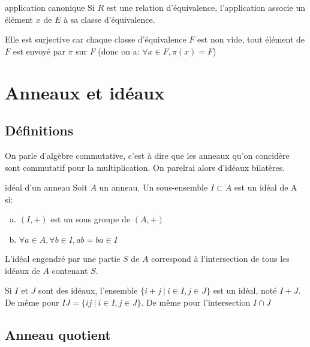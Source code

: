 \begin{proposition}{application canonique}{}
    Si $R$ est une relation d'équivalence, l'application 
    associe un élément $x$ de $E$ à sa classe d'équivalence.

    Elle est surjective car chaque classe d'équivalence $F$ est non vide, tout élément de $F$ est envoyé par
    $\pi$ sur $F$ (donc on a: $\forall x \in F, \pi(x) = F$)
\end{proposition}





\newpage


\section{Anneaux et idéaux}

\subsection{Définitions}

On parle d'algèbre commutative, c'est à dire que les anneaux qu'on concidère sont
commutatif pour la multiplication. On parelrai alors d'idéaux bilatères.

\begin{definition}{idéal d'un anneau}{}
    Soit $A$ un anneau. Un sous-ensemble $I \subset A$ est un idéal de A si:
    \begin{enumerate}[(a)]
        \item $(I, +)$ est un sous groupe de $(A, +)$
        \item $\forall a \in A, \forall b \in I, ab = ba \in I$
    \end{enumerate}
\end{definition}

\begin{proposition}{}{}
    L'idéal engendré par une partie $S$ de $A$ correspond à l'intersection de tous les
    idéaux de $A$ contenant $S$.
\end{proposition}

    
Si $I$ et $J$ sont des idéaux, l'ensemble $\{i + j ~ | ~ i \in I, j \in J\}$ est un idéal,
noté $I+J$. De même pour $IJ = \{ij ~ | ~ i \in I, j \in J\}$. 
De même pour l'intersection $I \cap J$



\subsection{Anneau quotient}

